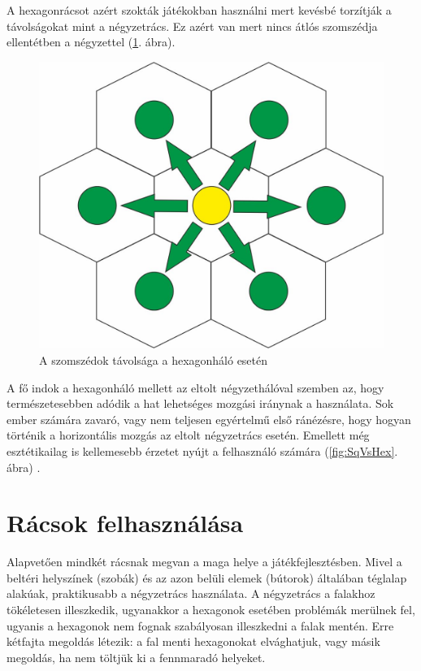 A hexagonrácsot azért szokták játékokban használni mert kevésbé torzítják a távolságokat mint a négyzetrács. Ez azért van mert nincs átlós szomszédja ellentétben a négyzettel (\ref{fig:HexDistance}. ábra).

\begin{figure}[h!]
\centering
\includegraphics[scale=0.4]{kepek/HexDistance.jpg}
\caption{A szomszédok távolsága a hexagonháló esetén}
\label{fig:HexDistance}
\end{figure}

A fő indok a hexagonháló mellett az eltolt négyzethálóval szemben az, hogy természetesebben adódik a hat lehetséges mozgási iránynak a használata. Sok ember számára zavaró, vagy nem teljesen egyértelmű első ránézésre, hogy hogyan történik a horizontális mozgás az eltolt négyzetrács esetén. Emellett még esztétikailag is kellemesebb érzetet nyújt a felhasználó számára (\ref{fig:SqVsHex}. ábra) \cite{catlikecoding}.
\newpage
\section{Rácsok felhasználása}

Alapvetően mindkét rácsnak megvan a maga helye a játékfejlesztésben.  Mivel a beltéri helyszínek (szobák) és az azon belüli elemek (bútorok) általában téglalap alakúak, praktikusabb a négyzetrács használata. A négyzetrács a falakhoz tökéletesen illeszkedik, ugyanakkor a hexagonok esetében problémák merülnek fel, ugyanis a hexagonok nem fognak szabályosan illeszkedni a falak mentén. Erre kétfajta megoldás létezik: a fal menti hexagonokat elvághatjuk, vagy másik megoldás, ha nem töltjük ki a fennmaradó helyeket.

